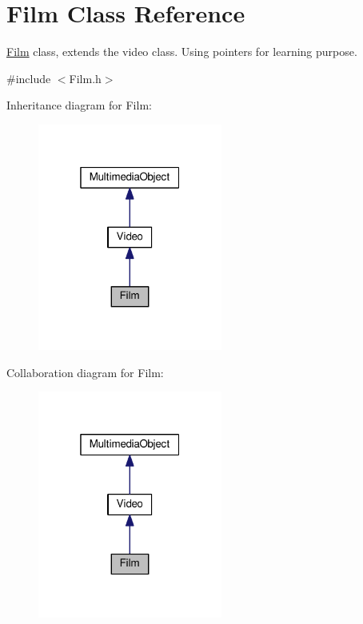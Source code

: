 \hypertarget{classFilm}{}\section{Film Class Reference}
\label{classFilm}


\hyperlink{classFilm}{Film} class, extends the video class. Using pointers for learning purpose.  




{\ttfamily \#include $<$Film.\+h$>$}



Inheritance diagram for Film\+:
\nopagebreak
\begin{figure}[H]
\begin{center}
\leavevmode
\includegraphics[width=172pt]{classFilm__inherit__graph}
\end{center}
\end{figure}


Collaboration diagram for Film\+:
\nopagebreak
\begin{figure}[H]
\begin{center}
\leavevmode
\includegraphics[width=172pt]{classFilm__coll__graph}
\end{center}
\end{figure}
